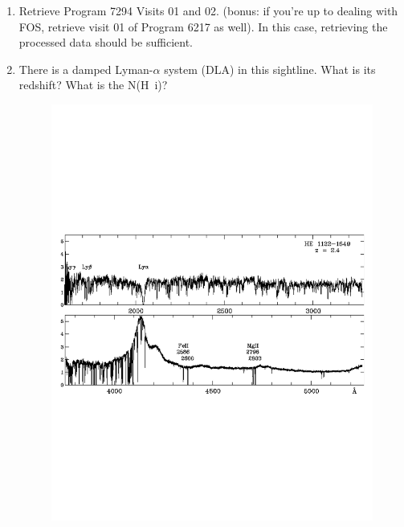 \begin{enumerate}
	\item Retrieve Program 7294 Visits 01 and 02. (bonus: if you're up to dealing with FOS, retrieve visit 01 of 
		Program 6217 as well). In this case, retrieving the processed data should be sufficient.
	\item There is a damped Lyman-$\alpha$ system (DLA) in this sightline. What is its redshift? What is the 
		N(H~{\sc i})?
		\begin{center}

     		\begin{figure}[htbp]
		\begin{center}
                  \includegraphics[scale = 0.7, angle=0.0]{ex2_spectrum.pdf}
                  \caption[Fake Caption?]{{\color{red}{An exmaple spectrum of a different QSO UV spectrum with a different redshift. The Lyman Alpha and Magnesium II lines are labeled, which should help you find these lines in AO 0235+164's spectrum \footnotemark.}}}
		\end{center}
		\end{figure}
		\end{center}


\end{enumerate}
